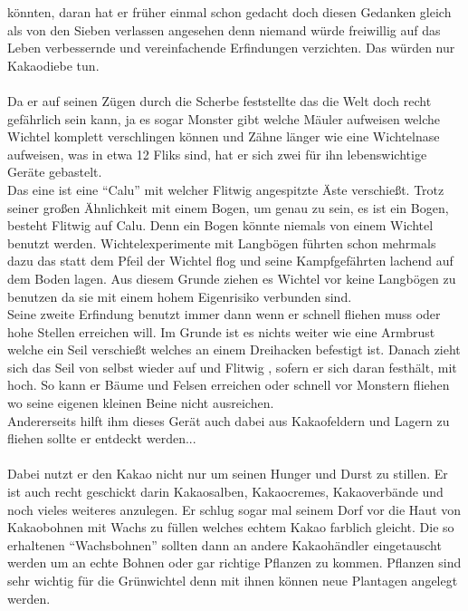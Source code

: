 \documentclass[10pt, a4paper]{proc}
\newcommand{\Kurzname}{Flitwig }
\begin{document}
k{\"o}nnten, daran hat er fr{\"u}her einmal schon gedacht doch diesen
Gedanken gleich als von den Sieben verlassen angesehen denn
niemand w{\"u}rde freiwillig auf das Leben verbessernde und
vereinfachende Erfindungen verzichten. Das w{\"u}rden nur Kakaodiebe
tun.\\\\Da er auf seinen Z{\"u}gen durch die Scherbe feststellte das
die Welt doch recht gef{\"a}hrlich sein kann, ja es sogar Monster gibt
welche M{\"a}uler aufweisen welche Wichtel komplett verschlingen
k{\"o}nnen und Z{\"a}hne l{\"a}nger wie eine Wichtelnase aufweisen, was in
etwa 12 Fliks sind, hat er sich zwei f{\"u}r ihn lebenswichtige Ger{\"a}te
gebastelt.\\Das eine ist eine "`Calu"' mit welcher \Kurzname
angespitzte {\"A}ste verschie{\ss}t. Trotz seiner gro{\ss}en {\"A}hnlichkeit mit
einem Bogen, um genau zu sein, es ist ein Bogen, besteht \Kurzname
auf Calu. Denn ein Bogen k{\"o}nnte niemals von einem Wichtel benutzt
werden. Wichtelexperimente mit Langb{\"o}gen f{\"u}hrten schon mehrmals
dazu das statt dem Pfeil der Wichtel flog und seine Kampfgef{\"a}hrten
lachend auf dem Boden lagen. Aus diesem Grunde ziehen es Wichtel
vor keine Langb{\"o}gen zu benutzen da sie mit einem hohem Eigenrisiko
verbunden sind.\\Seine zweite Erfindung benutzt immer dann wenn er
schnell fliehen muss oder hohe Stellen erreichen will. Im Grunde
ist es nichts weiter wie eine Armbrust welche ein Seil verschie{\ss}t
welches an einem Dreihacken befestigt ist. Danach zieht sich das
Seil von selbst wieder auf und \Kurzname, sofern er sich daran
festh{\"a}lt, mit hoch. So kann er B{\"a}ume und Felsen erreichen oder
schnell vor Monstern fliehen wo seine eigenen kleinen Beine nicht
ausreichen.\\Andererseits hilft ihm dieses Ger{\"a}t auch dabei aus
Kakaofeldern und Lagern zu fliehen sollte er entdeckt
werden...\\\\Dabei nutzt er den Kakao nicht nur um seinen Hunger
und Durst zu stillen. Er ist auch recht geschickt darin
Kakaosalben, Kakaocremes, Kakaoverb{\"a}nde und noch vieles weiteres
anzulegen. Er schlug sogar mal seinem Dorf vor die Haut von
Kakaobohnen mit Wachs zu f{\"u}llen welches echtem Kakao farblich
gleicht. Die so erhaltenen "`Wachsbohnen"' sollten dann an andere
Kakaoh{\"a}ndler eingetauscht werden um an echte Bohnen oder gar
richtige Pflanzen zu kommen. Pflanzen sind sehr wichtig f{\"u}r die
Gr{\"u}nwichtel denn mit ihnen k{\"o}nnen neue Plantagen angelegt werden.
\end{document}
